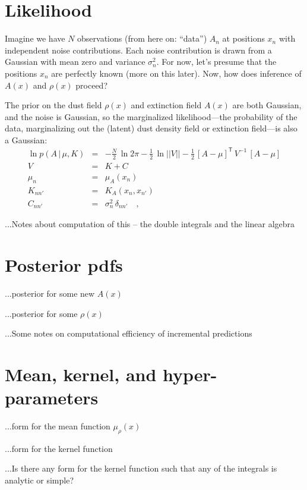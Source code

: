 \documentclass[12pt, letterpaper]{article}
\newcommand{\given}{\,|\,}
\newcommand{\inverse}[1]{{#1}^{-1}}
\newcommand{\transpose}[1]{{#1}^{\mathsf{T}}}
\renewcommand{\det}[1]{||{#1}||}
\begin{document}
\section{Likelihood}

Imagine we have $N$ observations (from here on: ``data'') $A_n$ at
positions $x_n$ with independent noise contributions.
Each noise contribution is drawn from a Gaussian with mean zero and
variance $\sigma^2_n$.
For now, let's presume that the positions $x_n$ are perfectly known
(more on this later).
Now, how does inference of $A(x)$ and $\rho(x)$ proceed?

The prior on the dust field $\rho(x)$ and extinction field $A(x)$ are
both Gaussian, and the noise is Gaussian, so the marginalized
likelihood---the probability of the data, marginalizing out the
(latent) dust density field or extinction field---is also a Gaussian:
\begin{eqnarray}
\ln p(A\given\mu,K) &=& -\frac{N}{2}\,\ln 2\pi - \frac{1}{2}\,\ln\det{V} - \frac{1}{2}\,\transpose{[A-\mu]}\,\inverse{V}\,[A-\mu]
\\
V &=& K + C
\\
\mu_n &=& \mu_A(x_n)
\\
K_{nn'} &=& K_A(x_n, x_{n'})
\\
C_{nn'} &=& \sigma^2_n\,\delta_{nn'}
\quad ,
\end{eqnarray}

...Notes about computation of this -- the double integrals and the linear algebra

\section{Posterior pdfs}

...posterior for some new $A(x)$

...posterior for some $\rho(x)$

...Some notes on computational efficiency of incremental predictions

\section{Mean, kernel, and hyper-parameters}

...form for the mean function $\mu_\rho(x)$

...form for the kernel function

...Is there any form for the kernel function such that any of the integrals is analytic or simple?
\end{document}
